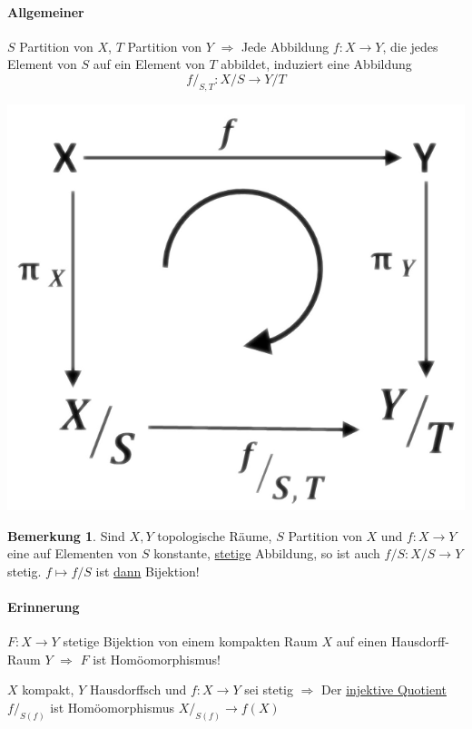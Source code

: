 \documentclass[a4paper,11pt,notitlepage]{report}
\theoremstyle{definition}
\newtheorem{remark}{Bemerkung}[chapter]
\begin{document}
\paragraph{Allgemeiner}
$S$ Partition von $X$, $T$ Partition von $Y$
\newline
$\Rightarrow$ Jede Abbildung $f \colon X \rightarrow Y$, die jedes Element von $S$ auf ein Element von $T$ abbildet, induziert eine Abbildung 
$$f/_{S,T} \colon X/S \rightarrow Y/T$$
\begin{center}
	\includegraphics[scale=0.4]{images/f_modulo_S_T_Diagramm.png}
\end{center}

\begin{remark}
	Sind $X,Y$ topologische Räume, $S$ Partition von $X$ und $f \colon X \rightarrow Y$ eine auf Elementen von $S$ konstante, \underline{stetige} Abbildung, so ist auch $f/S \colon X/S \rightarrow Y$ stetig.
	\newline
	$f \mapsto f/S$ ist \underline{dann} Bijektion! 
\end{remark}

\paragraph{Erinnerung}
$F \colon X \rightarrow Y$ stetige Bijektion von einem kompakten Raum $X$ auf einen Hausdorff-Raum $Y$ $\Rightarrow$ $F$ ist Homöomorphismus!

\begin{corollary}
	$X$ kompakt, $Y$ Hausdorffsch und $f \colon X \rightarrow Y$ sei stetig 
	$\Rightarrow$ Der \underline{injektive Quotient} $f/_{S(f)}$ ist Homöomorphismus $X/_{S(f)} \rightarrow f(X)$
\end{corollary}
\end{document}
